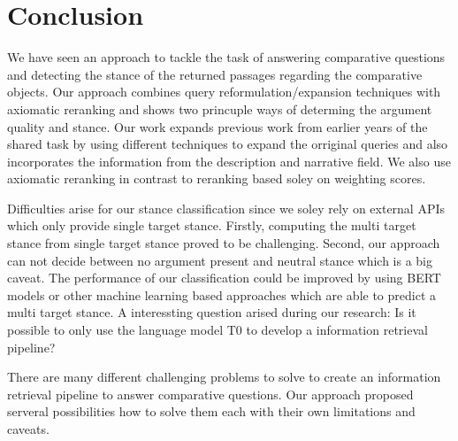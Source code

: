 \section{Conclusion}
    We have seen an approach to tackle the task of answering comparative questions and detecting the stance of the returned passages regarding the comparative objects. Our approach combines query reformulation/expansion techniques with axiomatic reranking and shows two princuple ways of determing the argument quality and stance. Our work expands previous work from earlier years of the shared task by using different techniques to expand the orriginal queries and also incorporates the information from the description and narrative field. We also use axiomatic reranking in contrast to reranking based soley on weighting scores.\par
    Difficulties arise for our stance classification since we soley rely on external APIs which only provide single target stance. Firstly, computing the multi target stance from single target stance proved to be challenging. Second, our approach can not decide between no argument present and neutral stance which is a big caveat. The performance of our classification could be improved by using BERT models or other machine learning based approaches which are able to predict a multi target stance. A interessting question arised during our research: Is it possible to only use the language model T0 to develop a information retrieval pipeline?\par
    There are many different challenging problems to solve to create an information retrieval pipeline to answer comparative questions. Our approach proposed serveral possibilities how to solve them each with their own limitations and caveats.    